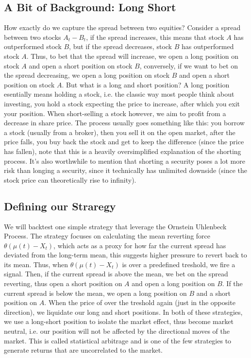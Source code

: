 \documentclass{article}
\begin{document}
\begin{spacing}{2.0}
\subsection{A Bit of Background: Long Short}

How exactly do we capture the spread between two equities? Consider a spread between two stocks $A_{t} - B_{t}$, if the spread increases, this means that stock $A$ has outperformed stock
$B$, but if the spread decreases, stock $B$ has outperformed stock $A$. Thus, to bet that the spread will increase, we open a long position on stock $A$ and open a short position on
stock $B$, conversely, if we want to bet on the spread decreasing, we open a long position on stock $B$ and open a short position on stock $A$. But what is a long and short position?
A long position esentially means holding a stock, i.e. the classic way most people think about investing, you hold a stock expecting the price to increase, after which you exit your
position. When short-selling a stock however, we aim to profit from a decrease in share price. The process usually goes something like this: you borrow a stock (usually from a broker),
then you sell it on the open market, after the price falls, you buy back the stock and get to keep the difference (since the price has fallen), note that this is a heavily oversimplified
explanation of the shorting process. It's also worthwhile to mention that shorting a security poses a lot more risk than longing a security, since it technically has unlimited downside
(since the stock price can theoretically rise to infinity).

\subsection{Defining our Straregy}

We will backtest one simple strategy that leverage the Ornstein Uhlenbeck Process. The strategy focuses on calculating the mean reverting force $\theta (\mu(t) - X_{t})$, which acts as a proxy
for how far the current spread has deviated from the long-term mean, this suggests higher pressure to revert back to its mean. Thus, when $\theta(\mu(t) - X_{t})$ is over a predefined treshold, we
fire a signal. Then, if the current spread is above the mean, we bet on the spread reverting, thus open a short position on $A$ and open a long position on $B$. If the current spread
is below the mean, we open a long position on $B$ and a short position on $A$. When the price of over the treshold again (just in the opposite direction), we liquidate our long
and short positions. In both of these strategies, we use a long-short position to isolate the market effect, thus become market neutral, i.e. our position will
not be affected by the directional moves of the market. This is called statistical arbitrage and is one of the few strategies to generate returns that are uncorrelated to the market.


\end{spacing}
\end{document}
